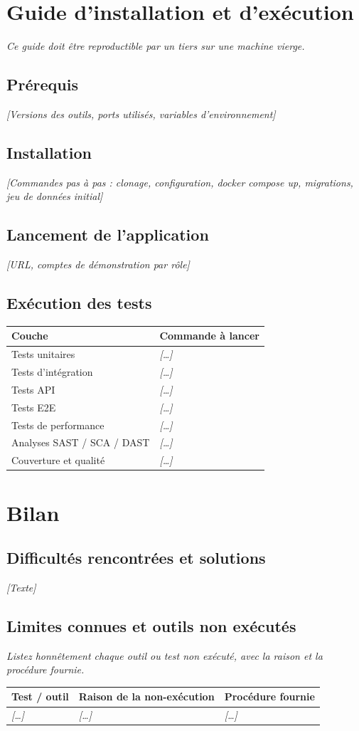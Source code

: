 \documentclass[11pt,a4paper]{article}
\newcommand{\ph}[1]{\textit{[#1]}}
\newcommand{\guide}[1]{\par{\small\itshape #1}\par\medskip}
\begin{document}
\section{Guide d'installation et d'ex\'ecution}
\guide{Ce guide doit \^etre reproductible par un tiers sur une machine vierge.}
\subsection{Pr\'erequis}
\ph{Versions des outils, ports utilis\'es, variables d'environnement}
\subsection{Installation}
\ph{Commandes pas \`a pas : clonage, configuration, docker compose up, migrations, jeu de donn\'ees initial}
\subsection{Lancement de l'application}
\ph{URL, comptes de d\'emonstration par r\^ole}
\subsection{Ex\'ecution des tests}
\noindent\begin{tabularx}{\textwidth}{|L{5cm}|Y|}\hline
\textbf{Couche} & \textbf{Commande \`a lancer} \\ \hline
Tests unitaires & \ph{\dots} \\ \hline
Tests d'int\'egration & \ph{\dots} \\ \hline
Tests API & \ph{\dots} \\ \hline
Tests E2E & \ph{\dots} \\ \hline
Tests de performance & \ph{\dots} \\ \hline
Analyses SAST / SCA / DAST & \ph{\dots} \\ \hline
Couverture et qualit\'e & \ph{\dots} \\ \hline
\end{tabularx}

\section{Bilan}
\subsection{Difficult\'es rencontr\'ees et solutions}
\ph{Texte}
\subsection{Limites connues et outils non ex\'ecut\'es}
\guide{Listez honn\^etement chaque outil ou test non ex\'ecut\'e, avec la raison et la proc\'edure fournie.}
\noindent\begin{tabularx}{\textwidth}{|L{4cm}|Y|Y|}\hline
\textbf{Test / outil} & \textbf{Raison de la non-ex\'ecution} & \textbf{Proc\'edure fournie} \\ \hline
\ph{\dots} & \ph{\dots} & \ph{\dots} \\ \hline
\end{tabularx}
\end{document}
